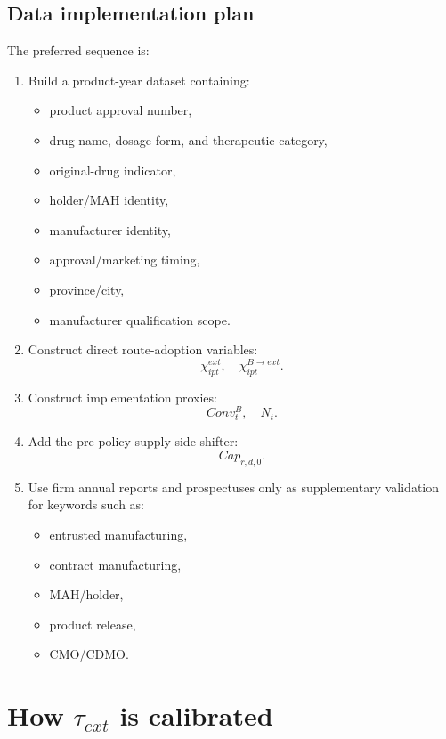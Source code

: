 \documentclass[12pt]{article}
\begin{document}
\subsection{Data implementation plan}

The preferred sequence is:

\begin{enumerate}[leftmargin=2em]
    \item Build a product-year dataset containing:
    \begin{itemize}[leftmargin=2em]
        \item product approval number,
        \item drug name, dosage form, and therapeutic category,
        \item original-drug indicator,
        \item holder/MAH identity,
        \item manufacturer identity,
        \item approval/marketing timing,
        \item province/city,
        \item manufacturer qualification scope.
    \end{itemize}

    \item Construct direct route-adoption variables:
    \[
    \chi^{ext}_{ipt}, \quad \chi^{B\to ext}_{ipt}.
    \]

    \item Construct implementation proxies:
    \[
    Conv^B_t, \quad N_t.
    \]

    \item Add the pre-policy supply-side shifter:
    \[
    Cap_{r,d,0}.
    \]

    \item Use firm annual reports and prospectuses only as supplementary validation for
    keywords such as:
    \begin{itemize}[leftmargin=2em]
        \item entrusted manufacturing,
        \item contract manufacturing,
        \item MAH/holder,
        \item product release,
        \item CMO/CDMO.
    \end{itemize}
\end{enumerate}

\section{How \texorpdfstring{$\tau_{ext}$}{tau_ext} is calibrated}
\end{document}
